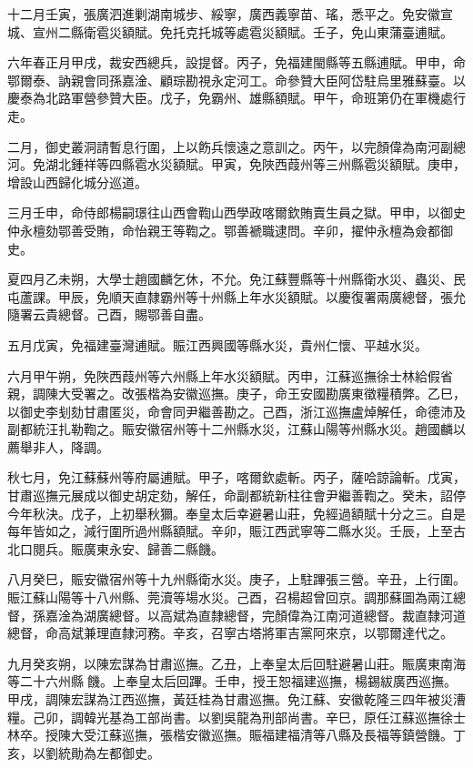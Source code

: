 \begin{pinyinscope}
十二月壬寅，張廣泗進剿湖南城步、綏寧，廣西義寧苗、瑤，悉平之。免安徽宣城、宣州二縣衛雹災額賦。免托克托城等處雹災額賦。壬子，免山東蒲臺逋賦。

六年春正月甲戌，裁安西總兵，設提督。丙子，免福建閩縣等五縣逋賦。甲申，命鄂爾泰、訥親會同孫嘉淦、顧琮勘視永定河工。命參贊大臣阿岱駐烏里雅蘇臺。以慶泰為北路軍營參贊大臣。戊子，免霸州、雄縣額賦。甲午，命班第仍在軍機處行走。

二月，御史叢洞請暫息行圍，上以飭兵懷遠之意訓之。丙午，以完顏偉為南河副總河。免湖北鍾祥等四縣雹水災額賦。甲寅，免陜西葭州等三州縣雹災額賦。庚申，增設山西歸化城分巡道。

三月壬申，命侍郎楊嗣璟往山西會鞫山西學政喀爾欽賄賣生員之獄。甲申，以御史仲永檀劾鄂善受賄，命怡親王等鞫之。鄂善褫職逮問。辛卯，擢仲永檀為僉都御史。

夏四月乙未朔，大學士趙國麟乞休，不允。免江蘇豐縣等十州縣衛水災、蟲災、民屯蘆課。甲辰，免順天直隸霸州等十州縣上年水災額賦。以慶復署兩廣總督，張允隨署云貴總督。己酉，賜鄂善自盡。

五月戊寅，免福建臺灣逋賦。賑江西興國等縣水災，貴州仁懷、平越水災。

六月甲午朔，免陜西葭州等六州縣上年水災額賦。丙申，江蘇巡撫徐士林給假省親，調陳大受署之。改張楷為安徽巡撫。庚子，命王安國勘廣東徵糧積弊。乙巳，以御史李刬劾甘肅匿災，命會同尹繼善勘之。己酉，浙江巡撫盧焯解任，命德沛及副都統汪扎勒鞫之。賑安徽宿州等十二州縣水災，江蘇山陽等州縣水災。趙國麟以薦舉非人，降調。

秋七月，免江蘇蘇州等府屬逋賦。甲子，喀爾欽處斬。丙子，薩哈諒論斬。戊寅，甘肅巡撫元展成以御史胡定劾，解任，命副都統新柱往會尹繼善鞫之。癸未，詔停今年秋決。戊子，上初舉秋獮。奉皇太后幸避暑山莊，免經過額賦十分之三。自是每年皆如之，減行圍所過州縣額賦。辛卯，賑江西武寧等二縣水災。壬辰，上至古北口閱兵。賑廣東永安、歸善二縣饑。

八月癸巳，賑安徽宿州等十九州縣衛水災。庚子，上駐蹕張三營。辛丑，上行圍。賑江蘇山陽等十八州縣、莞瀆等場水災。己酉，召楊超曾回京。調那蘇圖為兩江總督，孫嘉淦為湖廣總督。以高斌為直隸總督，完顏偉為江南河道總督。裁直隸河道總督，命高斌兼理直隸河務。辛亥，召寧古塔將軍吉黨阿來京，以鄂爾達代之。

九月癸亥朔，以陳宏謀為甘肅巡撫。乙丑，上奉皇太后回駐避暑山莊。賑廣東南海等二十六州縣饑。上奉皇太后回蹕。壬申，授王恕福建巡撫，楊錫紱廣西巡撫。甲戌，調陳宏謀為江西巡撫，黃廷桂為甘肅巡撫。免江蘇、安徽乾隆三四年被災漕糧。己卯，調韓光基為工部尚書。以劉吳龍為刑部尚書。辛巳，原任江蘇巡撫徐士林卒。授陳大受江蘇巡撫，張楷安徽巡撫。賑福建福清等八縣及長福等鎮營饑。丁亥，以劉統勛為左都御史。


\end{pinyinscope}
